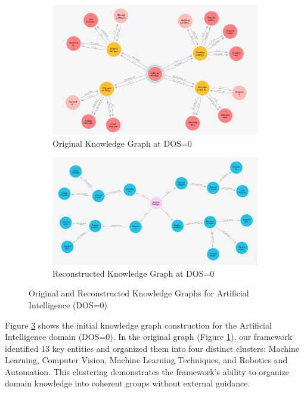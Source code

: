 \documentclass[11pt]{article}
\begin{document}
\begin{figure}[H]
    \centering
    \begin{subfigure}[b]{0.48\columnwidth}
        \centering
        \includegraphics[width=\textwidth]{img/original_dos0_Artificial_intelligence.png}
        \caption{Original Knowledge Graph at DOS=0}
        \label{fig:dos0_original}
    \end{subfigure}
    \hfill
    \begin{subfigure}[b]{0.48\columnwidth}
        \centering
        \includegraphics[width=\textwidth]{img/reconstructed_dos0_Artificial_intelligence.png}
        \caption{Reconstructed Knowledge Graph at DOS=0}
        \label{fig:dos0_reconstructed}
    \end{subfigure}
    \caption{Original and Reconstructed Knowledge Graphs for Artificial Intelligence (DOS=0)}
    \label{fig:comparison_dos0}
\end{figure}

Figure \ref{fig:comparison_dos0} shows the initial knowledge graph construction for the Artificial Intelligence domain (DOS=0). In the original graph (Figure \ref{fig:dos0_original}), our framework identified 13 key entities and organized them into four distinct clusters: Machine Learning, Computer Vision, Machine Learning Techniques, and Robotics and Automation. This clustering demonstrates the framework's ability to organize domain knowledge into coherent groups without external guidance.
\end{document}
